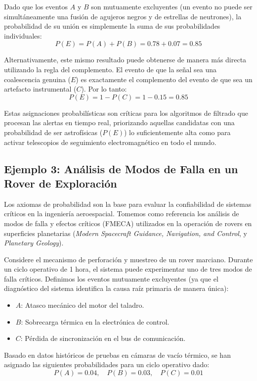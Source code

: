 Dado que los eventos $A$ y $B$ son mutuamente excluyentes (un evento no puede ser simultáneamente una fusión de agujeros negros y de estrellas de neutrones), la probabilidad de su unión es simplemente la suma de sus probabilidades individuales:
$$ P(E) = P(A) + P(B) = 0.78 + 0.07 = 0.85 $$

Alternativamente, este mismo resultado puede obtenerse de manera más directa utilizando la regla del complemento. El evento de que la señal sea una coalescencia genuina ($E$) es exactamente el complemento del evento de que sea un artefacto instrumental ($C$). Por lo tanto:
$$ P(E) = 1 - P(C) = 1 - 0.15 = 0.85 $$

Estas asignaciones probabilísticas son críticas para los algoritmos de filtrado que procesan las alertas en tiempo real, priorizando aquellas candidatas con una probabilidad de ser astrofísicas ($P(E)$) lo suficientemente alta como para activar telescopios de seguimiento electromagnético en todo el mundo.

\subsection{Ejemplo 3: Análisis de Modos de Falla en un Rover de Exploración}

Los axiomas de probabilidad son la base para evaluar la confiabilidad de sistemas críticos en la ingeniería aeroespacial. Tomemos como referencia los análisis de modos de falla y efectos críticos (FMECA) utilizados en la operación de rovers en superficies planetarias (\textit{Modern Spacecraft Guidance, Navigation, and Control}, y \textit{Planetary Geology}).

Considere el mecanismo de perforación y muestreo de un rover marciano. Durante un ciclo operativo de 1 hora, el sistema puede experimentar uno de tres modos de falla críticos. Definimos los eventos mutuamente excluyentes (ya que el diagnóstico del sistema identifica la causa raíz primaria de manera única):
\begin{itemize}
    \item $A$: Atasco mecánico del motor del taladro.
    \item $B$: Sobrecarga térmica en la electrónica de control.
    \item $C$: Pérdida de sincronización en el bus de comunicación.
\end{itemize}

Basado en datos históricos de pruebas en cámaras de vacío térmico, se han asignado las siguientes probabilidades para un ciclo operativo dado:
$$ P(A) = 0.04, \quad P(B) = 0.03, \quad P(C) = 0.01 $$

